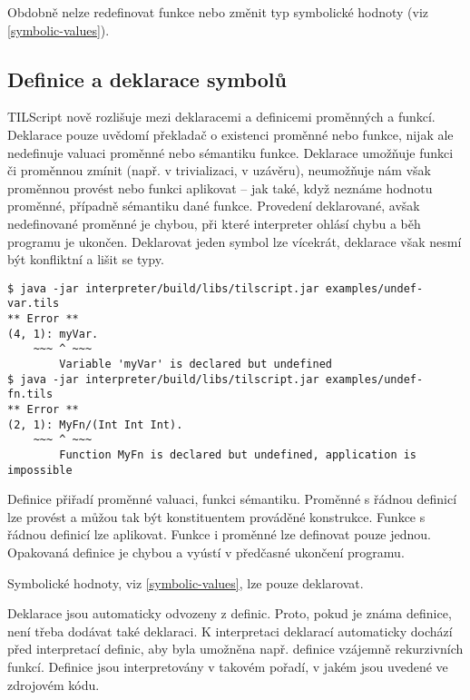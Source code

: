 Obdobně nelze redefinovat funkce nebo změnit typ symbolické hodnoty (viz \ref{symbolic-values}).

\subsection{Definice a deklarace symbolů}

TILScript nově rozlišuje mezi deklaracemi a definicemi proměnných a funkcí. Deklarace pouze
uvědomí překladač o existenci proměnné nebo funkce, nijak ale nedefinuje valuaci proměnné nebo
sémantiku funkce. Deklarace umožňuje funkci či proměnnou zmínit (např. v trivializaci, v uzávěru),
neumožňuje nám však proměnnou provést nebo funkci aplikovat -- jak také, když neznáme hodnotu
proměnné, případně sémantiku dané funkce. Provedení deklarované, avšak nedefinované proměnné
je chybou, při které interpreter ohlásí chybu a běh programu je ukončen. Deklarovat jeden symbol
lze vícekrát, deklarace však nesmí být konfliktní a lišit se typy.

\begin{lstlisting}[caption={Hlášení chyby při chybějící definici}]
$ java -jar interpreter/build/libs/tilscript.jar examples/undef-var.tils
** Error **
(4, 1): myVar.
    ~~~ ^ ~~~
        Variable 'myVar' is declared but undefined
$ java -jar interpreter/build/libs/tilscript.jar examples/undef-fn.tils
** Error **
(2, 1): MyFn/(Int Int Int).
    ~~~ ^ ~~~
        Function MyFn is declared but undefined, application is impossible
\end{lstlisting}

Definice přiřadí proměnné valuaci, funkci sémantiku. Proměnné s řádnou definicí lze provést
a můžou tak být konstituentem prováděné konstrukce. Funkce s řádnou definicí lze aplikovat. Funkce
i proměnné lze definovat pouze jednou. Opakovaná definice je chybou a vyústí v předčasné ukončení
programu.

Symbolické hodnoty, viz \ref{symbolic-values}, lze pouze deklarovat.

Deklarace jsou automaticky odvozeny z definic. Proto, pokud je známa definice, není třeba dodávat
také deklaraci. K interpretaci deklarací automaticky dochází před interpretací definic, aby byla
umožněna např. definice vzájemně rekurzivních funkcí. Definice jsou interpretovány v takovém
pořadí, v jakém jsou uvedené ve zdrojovém kódu.

